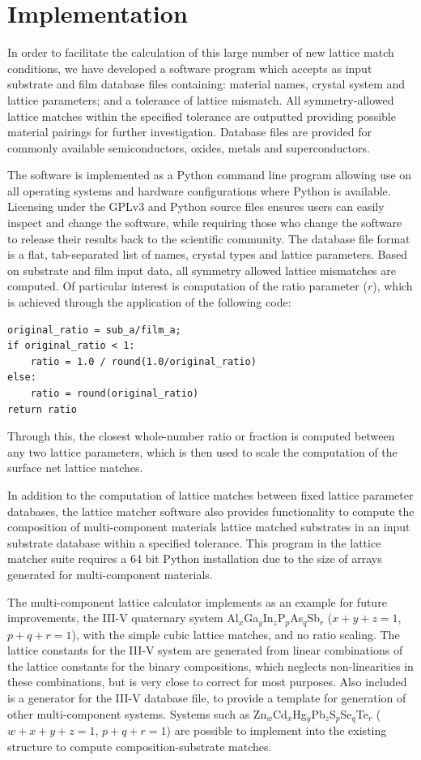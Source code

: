 \documentclass[final,5p,times,twocolumn]{elsarticle}
\begin{document}
\section{Implementation}
In order to facilitate the calculation of this large number of new lattice match conditions, we have developed a software program which accepts as input substrate and film database files containing: material names, crystal system and lattice parameters; and a tolerance of lattice mismatch. All symmetry-allowed lattice matches within the specified tolerance are outputted providing possible material pairings for further investigation. Database files are provided for commonly available semiconductors, oxides, metals and superconductors.

The software is implemented as a Python command line program allowing use on all operating systems and hardware configurations where Python is available. Licensing under the GPLv3 and Python source files ensures users can easily inspect and change the software, while requiring those who change the software to release their results back to the scientific community. The database file format is a flat, tab-separated list of names, crystal types and lattice parameters. Based on substrate and film input data, all symmetry allowed lattice mismatches are computed. Of particular interest is computation of the ratio parameter ($r$), which is achieved through the application of the following code:
\begin{verbatim}
original_ratio = sub_a/film_a;
if original_ratio < 1:
    ratio = 1.0 / round(1.0/original_ratio)
else:
    ratio = round(original_ratio)
return ratio
\end{verbatim}
Through this, the closest whole-number ratio or fraction is computed between any two lattice parameters, which is then used to scale the computation of the surface net lattice matches.

In addition to the computation of lattice matches between fixed lattice parameter databases, the lattice matcher software also provides functionality to compute the composition of multi-component materials lattice matched substrates in an input substrate database within a specified tolerance. This program in the lattice matcher suite requires a 64 bit Python installation due to the size of arrays generated for multi-component materials.

The multi-component lattice calculator implements as an example for future improvements, the III-V quaternary system Al$_x$Ga$_y$In$_z$P$_p$As$_q$Sb$_r$ ($x+y+z=1$, $p+q+r=1$), with the simple cubic lattice matches, and no ratio scaling. The lattice constants for the III-V system are generated from linear combinations of the lattice constants for the binary compositions\cite{Ahrenkiel2012}, which neglects non-linearities in these combinations, but is very close to correct for most purposes\cite{Moon1974,Adachi1982}. Also included is a generator for the III-V database file, to provide a template for generation of other multi-component systems. Systems such as Zn$_w$Cd$_x$Hg$_y$Pb$_z$S$_p$Se$_q$Te$_r$ ($w+x+y+z=1$, $p+q+r=1$)  are possible to implement into the existing structure to compute composition-substrate matches.
\end{document}

